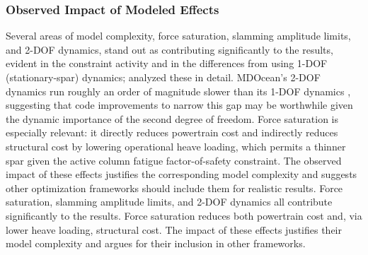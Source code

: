 \subsubsection{Observed Impact of Modeled Effects}
\ifdefined\DISSERTATION
    Several areas of model complexity, force saturation, slamming amplitude limits, and 2-DOF dynamics, stand out as contributing significantly to the results, evident in the constraint activity and in the differences from using 1-DOF (stationary-spar) dynamics;  analyzed these in detail.
    MDOcean's 2-DOF dynamics run roughly an order of magnitude slower than its 1-DOF dynamics \cite{mccabe_development_2026}, suggesting that code improvements to narrow this gap may be worthwhile given the dynamic importance of the second degree of freedom.
    Force saturation is especially relevant: it directly reduces powertrain cost and indirectly reduces structural cost by lowering operational heave loading, which permits a thinner spar given the active column fatigue factor-of-safety constraint.
    The observed impact of these effects justifies the corresponding model complexity and suggests other optimization frameworks should include them for realistic results.
\else
    Force saturation, slamming amplitude limits, and 2-DOF dynamics all contribute significantly to the results.%
    Force saturation reduces both powertrain cost and, via lower heave loading, structural cost.
    The impact of these effects justifies their model complexity and argues for their inclusion in other frameworks.
\fi

